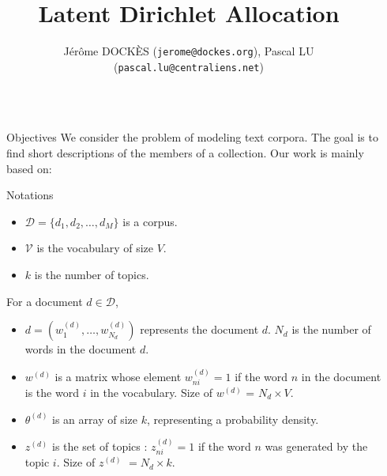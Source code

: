 \documentclass[final]{beamer}
\title{Latent Dirichlet Allocation \medskip} %
\author{J\'er\^ome DOCK\`ES {\small{(\texttt{jerome@dockes.org})}}, Pascal LU  {\small{(\texttt{pascal.lu@centraliens.net})}} } %
\institute{\'Ecole Normale Sup\'erieure de Cachan $-$ \today} %
\newlength{\sepwid}
\newlength{\onecolwid}
\begin{document}

\setlength{\belowcaptionskip}{2ex} %
\setlength\belowdisplayshortskip{2ex} %

\begin{frame}[t] 
\begin{columns}[t]


\begin{column}{\sepwid}\end{column} %

\begin{column}{\onecolwid}

\begin{alertblock}{Objectives}
We consider the problem of modeling text corpora. The goal is to find short descriptions of the members of a collection. Our work is mainly based on:
\nocite{*}
\small{}
\end{alertblock}


\begin{block}{Notations}
\begin{itemize}
  \item $\mathcal{D} = \{d_{1},d_{2}, \ldots, d_{M}\}$ is a corpus.
  \item $\mathcal{V}$ is the vocabulary of size $V$.
  \item $k$ is the number of topics.
\end{itemize}

For a document $d \in \mathcal{D}$,
\begin{itemize}  
  \item $d = (w_1^{(d)}, \ldots, w_{N_d}^{(d)})$ represents the document $d$. $N_d$ is the number of words in the document $d$.
  \item $w^{(d)}$ is a matrix whose element $w_{ni}^{(d)} = 1$ if the word $n$ in the document is the word $i$ in the vocabulary. Size of $w^{(d)}$ = $N_d \times V$.
 \item $\theta^{(d)}$ is an array of size $k$, representing a probability density.
 \item $z^{(d)}$ is the set of topics : $z_{ni}^{(d)} =  1$ if the word $n$ was generated by the topic $i$. Size of $z^{(d)}$ $= N_d \times k$.
\end{itemize}
\end{block}


\end{column}
\end{columns}
\end{frame}
\end{document}
